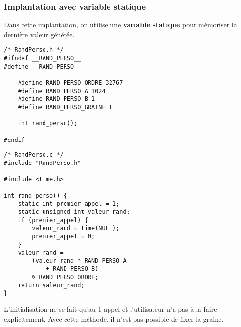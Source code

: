 \begin{frame}[fragile]\frametitle{Implantation avec variable statique}
Dans cette implantation, on utilise une {\bf variable statique} pour
mémoriser la dernière valeur générée.

\begin{center}
\begin{minipage}[c]{.41\textwidth}
\begin{lstlisting}[frame=single,numbers=none,basicstyle=\scriptsize\tt]
/* RandPerso.h */
#ifndef __RAND_PERSO__
#define __RAND_PERSO__

    #define RAND_PERSO_ORDRE 32767
    #define RAND_PERSO_A 1024
    #define RAND_PERSO_B 1
    #define RAND_PERSO_GRAINE 1

    int rand_perso();

#endif
\end{lstlisting}
\end{minipage}
\quad
\begin{minipage}[c]{.45\textwidth}
\begin{lstlisting}[frame=single,numbers=none,basicstyle=\scriptsize\tt]
/* RandPerso.c */
#include "RandPerso.h"

#include <time.h>

int rand_perso() {
    static int premier_appel = 1;
    static unsigned int valeur_rand;
    if (premier_appel) {
        valeur_rand = time(NULL);
        premier_appel = 0;
    }
    valeur_rand =
        (valeur_rand * RAND_PERSO_A
            + RAND_PERSO_B)
        % RAND_PERSO_ORDRE;
    return valeur_rand;
}
\end{lstlisting}
\end{minipage}
\end{center}

\begin{small}
L'initialisation ne se fait qu'au 1\ier{} appel et l'utilisateur n'a
pas à la faire explicitement. Avec cette méthode, il n'est pas possible
de fixer la graine.
\end{small}
\end{frame}


